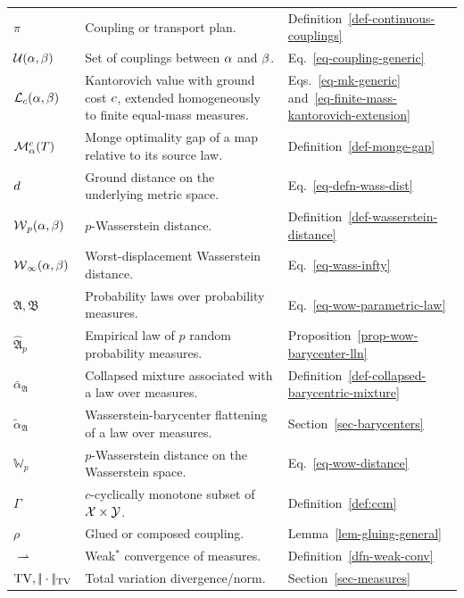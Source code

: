 {\begin{longtable}{>{\raggedright\arraybackslash}p{}
                  >{\raggedright\arraybackslash}p{}
                  >{\raggedright\arraybackslash}p{}}
\hline
\multicolumn{3}{l}{\textbf{Continuous Kantorovich OT and Wasserstein distances}}\\
\hline
$\pi$ & Coupling or transport plan. & Definition~\ref{def-continuous-couplings} \\
$\mathcal{U}(\alpha,\beta)$ & Set of couplings between $\alpha$ and $\beta$. & Eq.~\eqref{eq-coupling-generic} \\
$\mathcal{L}_c(\alpha,\beta)$ & Kantorovich value with ground cost $c$, extended homogeneously to finite equal-mass measures. & Eqs.~\eqref{eq-mk-generic} and~\eqref{eq-finite-mass-kantorovich-extension} \\
$\mathcal M_\alpha^c(T)$ & Monge optimality gap of a map relative to its source law. & Definition~\ref{def-monge-gap} \\
$d$ & Ground distance on the underlying metric space. & Eq.~\eqref{eq-defn-wass-dist} \\
$\operatorname{\mathcal{W}}_p(\alpha,\beta)$ & $p$-Wasserstein distance. & Definition~\ref{def-wasserstein-distance} \\
$\operatorname{\mathcal{W}}_\infty(\alpha,\beta)$ & Worst-displacement Wasserstein distance. & Eq.~\eqref{eq-wass-infty} \\
$\mathfrak A,\mathfrak B$ & Probability laws over probability measures. & Eq.~\eqref{eq-wow-parametric-law} \\
$\widehat{\mathfrak A}_p$ & Empirical law of $p$ random probability measures. & Proposition~\ref{prop-wow-barycenter-lln} \\
$\bar\alpha_{\mathfrak A}$ & Collapsed mixture associated with a law over measures. & Definition~\ref{def-collapsed-barycentric-mixture} \\
$\widetilde\alpha_{\mathfrak A}$ & Wasserstein-barycenter flattening of a law over measures. & Section~\ref{sec-barycenters} \\
$\mathbb W_p$ & $p$-Wasserstein distance on the Wasserstein space. & Eq.~\eqref{eq-wow-distance} \\
$\Gamma$ & $c$-cyclically monotone subset of $\mathcal{X}\times\mathcal{Y}$. & Definition~\ref{def:ccm} \\
$\rho$ & Glued or composed coupling. & Lemma~\ref{lem-gluing-general} \\
$\rightharpoonup$ & Weak$^*$ convergence of measures. & Definition~\ref{dfn-weak-conv} \\
$\operatorname{TV},|\!| \cdot |\!|_{\operatorname{TV}}$ & Total variation divergence/norm. & Section~\ref{sec-measures} \\


\end{longtable}}
